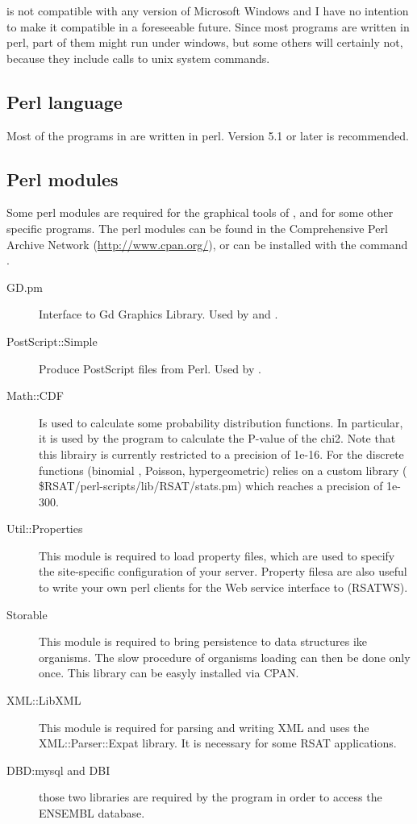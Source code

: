 \documentclass{book}
\begin{document}
\RSAT is not compatible with any version of Microsoft Windows and I
have no intention to make it compatible in a foreseeable future. Since
most programs are written in perl, part of them might run under
windows, but some others will certainly not, because they include
calls to unix system commands.

\subsection{Perl language}

Most of the programs in \RSAT are written in perl. Version 5.1 or
later is recommended.

\subsection{Perl modules}

Some perl modules are required for the graphical tools of \RSAT, and
for some other specific programs. The perl modules can be found in the
Comprehensive Perl Archive Network (\url{http://www.cpan.org/}), or
can be installed with the command .

\begin{description}
\item[GD.pm] Interface to Gd Graphics Library. Used by
   and .

\item[PostScript::Simple] Produce PostScript files from Perl. Used by
  .

\item[Math::CDF] Is used to calculate some probability distribution
  functions. In particular, it is used by the program
   to calculate the P-value of the
  chi2. Note that this librairy is currently restricted to a precision
  of 1e-16. For the discrete functions (binomial , Poisson,
  hypergeometric) \RSAT relies on a custom library (
  \$RSAT/perl-scripts/lib/RSAT/stats.pm) which reaches a precision of
  1e-300.

\item[Util::Properties] This module is required to load property
  files, which are used to specify the site-specific configuration of
  your \RSAT server. Property filesa are also useful to write your own
  perl clients for the Web service interface to \RSAT (RSATWS).

\item[Storable] This module is required to bring persistence to data
  structures ike organisms. The slow procedure of organisms loading
  can then be done only once. This library can be easyly installed via
  CPAN.

\item[XML::LibXML] This module is required for parsing and writing XML
  and uses the XML::Parser::Expat library. It is necessary for some
  RSAT applications.

\item[DBD:mysql and DBI] those two libraries are required by the
  program  in order to access the
  ENSEMBL database.

\end{description}
\end{document}
